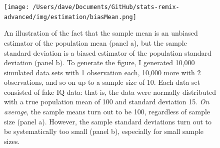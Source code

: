 \documentclass[
]{book}
\begin{document}
\begin{figure}
\centering
\texttt{[image: /Users/dave/Documents/GitHub/stats-remix-advanced/img/estimation/biasMean.png]}
\caption{\label{fig:estimatorbias}An illustration of the fact that the sample mean is an unbiased estimator of the population mean (panel a), but the sample standard deviation is a biased estimator of the population standard deviation (panel b). To generate the figure, I generated 10,000 simulated data sets with 1 observation each, 10,000 more with 2 observations, and so on up to a sample size of 10. Each data set consisted of fake IQ data: that is, the data were normally distributed with a true population mean of 100 and standard deviation 15. \emph{On average}, the sample means turn out to be 100, regardless of sample size (panel a). However, the sample standard deviations turn out to be systematically too small (panel b), especially for small sample sizes.}
\end{figure}
\end{document}
